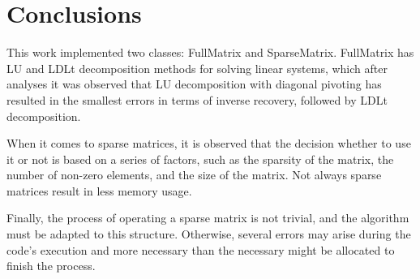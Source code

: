 \section{Conclusions} \label{sec:conclusions}
This work implemented two classes: FullMatrix and SparseMatrix. FullMatrix has LU and LDLt decomposition methods for solving linear systems, which after analyses it was observed that LU decomposition with diagonal pivoting has resulted in the smallest errors in terms of inverse recovery, followed by LDLt decomposition. 

When it comes to sparse matrices, it is observed that the decision whether to use it or not is based on a series of factors, such as the sparsity of the matrix, the number of non-zero elements, and the size of the matrix. Not always sparse matrices result in less memory usage. 

Finally, the process of operating a sparse matrix is not trivial, and the algorithm must be adapted to this structure. Otherwise, several errors may arise during the code's execution and more necessary than the necessary might be allocated to finish the process. 